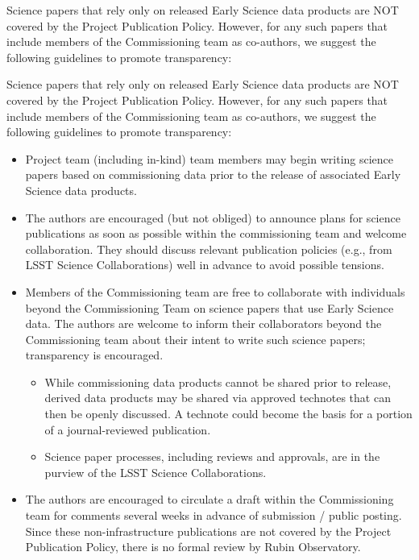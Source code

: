 \documentclass[SE,authoryear,toc,lsstdraft]{lsstdoc}
\begin{document}
Science papers that rely only on released Early Science data products are NOT covered by the Project Publication Policy.
However, for any such papers that include members of the Commissioning team as co-authors, we suggest the following guidelines to promote transparency:

Science papers that rely only on released Early Science data products are NOT covered by the Project Publication Policy.
However, for any such papers that include members of the Commissioning team as co-authors, we suggest the following guidelines to promote transparency:

\begin{itemize}

  \item Project team (including in-kind) team members may begin writing science papers based on commissioning data prior to the release of associated Early Science data products.

  \item The authors are encouraged (but not obliged) to announce plans for science publications as soon as possible within the commissioning team and welcome collaboration. They should discuss relevant publication policies (e.g., from LSST Science Collaborations) well in advance to avoid possible tensions.

  \item Members of the Commissioning team are free to collaborate with individuals beyond the Commissioning Team on science papers that use Early Science data. The authors are welcome to inform their collaborators beyond the Commissioning team about their intent to write such science papers; transparency is encouraged.

  \begin{itemize}

   \item  While commissioning data products cannot be shared prior to release, derived data products may be shared via approved technotes that can then be openly discussed. A technote could become the basis for a portion of a journal-reviewed publication.

   \item Science paper processes, including reviews and approvals, are in the purview of the LSST Science Collaborations.

  \end{itemize}

  \item The authors are encouraged to circulate a draft within the Commissioning team for comments several weeks in advance of submission / public posting.
  Since these non-infrastructure publications are not covered by the Project Publication Policy, there is no formal review by Rubin Observatory.


\end{itemize}
\end{document}
